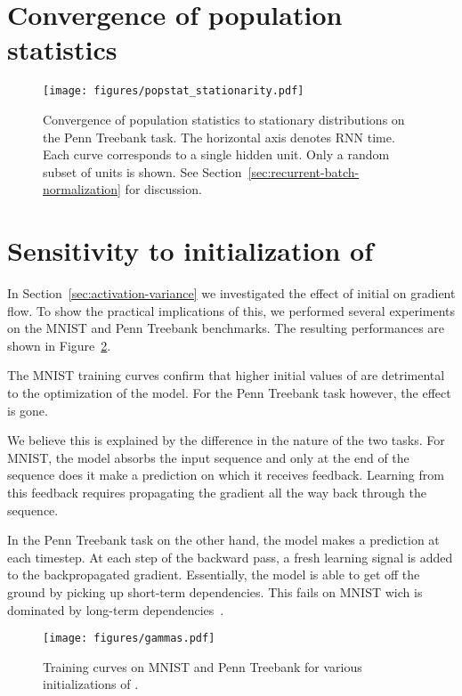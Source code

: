 \documentclass{article} \pdfoutput=1 \usepackage[utf8]{inputenc}
\begin{document}



\newpage

\appendix

\section{Convergence of population statistics} \label{sec:popstat_stationarity}

\begin{figure}[!h]
\center
\texttt{[image: figures/popstat\_stationarity.pdf]}
\caption{Convergence of population statistics to stationary distributions on the 
Penn Treebank task. The horizontal axis denotes RNN time. Each curve corresponds to a single hidden unit. Only a random subset of units is shown.
See Section~\ref{sec:recurrent-batch-normalization} for discussion.}
\label{fig:popstat_stationarity}
\end{figure}

\section{Sensitivity to initialization of }

In Section~\ref{sec:activation-variance} we investigated the effect of initial  on gradient flow.
To show the practical implications of this, we performed several experiments on the MNIST and Penn Treebank benchmarks.
The resulting performances are shown in Figure~\ref{fig:gammas}.

The MNIST training curves confirm that higher initial values of  are detrimental to the optimization of the model.
For the Penn Treebank task however, the effect is gone.

We believe this is explained by the difference in the nature of the two tasks.
For MNIST, the model absorbs the input sequence and only at the end of the sequence does it make a prediction on which it receives feedback.
Learning from this feedback requires propagating the gradient all the way back through the sequence.

In the Penn Treebank task on the other hand, the model makes a prediction at each timestep.
At each step of the backward pass, a fresh learning signal is added to the backpropagated gradient.
Essentially, the model is able to get off the ground by picking up short-term dependencies.
This fails on MNIST wich is dominated by long-term dependencies~\citep{urnn}.

\begin{figure}[!h]
\center
\texttt{[image: figures/gammas.pdf]}
\caption{Training curves on MNIST and Penn Treebank for various initializations of .}
\label{fig:gammas}
\end{figure}
\end{document}
